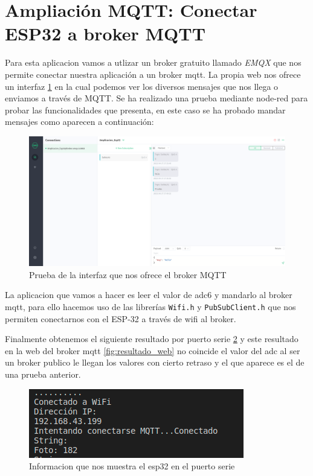 \documentclass[11pt, letterpaper]{article}
\begin{document}
\section{Ampliación MQTT: Conectar ESP32 a broker MQTT} 
Para esta aplicacion vamos a utlizar un broker gratuito llamado \textit{EMQX} que nos permite conectar nuestra aplicación a un broker mqtt.
La propia web nos ofrece un interfaz \ref{fig:intefaz_web} en la cual podemos ver los diversos mensajes que nos llega o enviamos a través de MQTT.
Se ha realizado una prueba mediante node-red para probar las funcionalidades que presenta, en este caso se ha probado mandar mensajes como aparecen
a continuación:

\begin{figure}[h]
    \centering
    \includegraphics[width=\textwidth]{Captura_mqtt_prueba.png}
    \caption{Prueba de la interfaz que nos ofrece el broker MQTT}
    \label{fig:intefaz_web}
\end{figure}

La aplicacion que vamos a hacer es leer el valor de adc6 y mandarlo al broker mqtt, para ello hacemos uso 
de las librerías \texttt{Wifi.h} y \texttt{PubSubClient.h} que nos permiten conectarnos con el ESP-32 a través de wifi 
al broker.

Finalmente obtenemos el siguiente resultado por puerto serie \ref{fig:puerto_serie} y este resultado en la web del broker mqtt \ref{fig:resultado_web}
no coincide el valor del adc al ser un broker publico le llegan los valores con cierto retraso y el que aparece es el de una prueba anterior.

\begin{figure}[h]
    \centering
    \includegraphics[width=\textwidth]{puerto_serie.png}
    \caption{Informacion que nos muestra el esp32 en el puerto serie}
    \label{fig:puerto_serie}
\end{figure}
\end{document}
